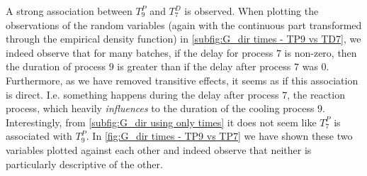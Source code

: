 \documentclass[../Thesis.tex]{subfiles}
\begin{document}
\begin{figure}[ht]
\begin{subfigure}[t]{0.49\linewidth}
        \caption{}
        \label{subfig:G_dir times - TP9 vs TD7}
    \end{subfigure}
    \caption{}
    \label{fig:G_dir using only times}
\end{figure}
A strong association between $T^P_9$ and $T^D_7$ is observed. When plotting the observations of the random variables (again with the continuous part transformed through the empirical density function) in \autoref{subfig:G_dir times - TP9 vs TD7}, we indeed observe that for many batches, if the delay for process $7$ is non-zero, then the duration of process $9$ is greater than if the delay after process $7$ was $0$. Furthermore, as we have removed transitive effects, it seems as if this association is direct. I.e. something happens during the delay after process $7$, the reaction process, which heavily \textit{influences} to the duration of the cooling process $9$. Interestingly, from \autoref{subfig:G_dir using only times} it does not seem like $T^P_7$ is associated with $T^P_9$. In \autoref{fig:G_dir times - TP9 vs TP7} we have shown these two variables plotted against each other and indeed observe that neither is particularly descriptive of the other.
\end{document}
